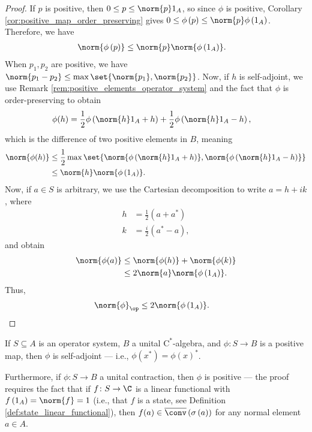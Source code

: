 \begin{proof}
  If $p$ is positive, then $0\leq p \leq \norm{p}1_A$, so since $\phi$ is positive, Corollary \ref{cor:positive_map_order_preserving} gives $0\leq \phi\left( p \right)\leq \norm{p}\phi\left( 1_A \right)$. Therefore, we have
  \begin{align*}
    \norm{\phi\left( p \right)} &\leq \norm{p}\norm{\phi\left( 1_A \right)}.
  \end{align*}
  When $p_1,p_2$ are positive, we have $\norm{p_1 - p_2}\leq \max\set{\norm{p_1},\norm{p_2}}$. Now, if $h$ is self-adjoint, we use Remark \ref{rem:positive_elements_operator_system} and the fact that $\phi$ is order-preserving to obtain
  \begin{align*}
    \phi(h) &= \frac{1}{2}\phi\left( \norm{h}1_A + h \right) + \frac{1}{2}\phi\left( \norm{h}1_A - h \right),
  \end{align*}
  which is the difference of two positive elements in $B$, meaning
  \begin{align*}
    \norm{\phi(h)} &\leq \frac{1}{2}\max\set{\norm{\phi\left( \norm{h}1_A + h \right)},\norm{\phi\left( \norm{h}1_A - h \right)}}\\
                   &\leq \norm{h}\norm{\phi\left( 1_A \right)}.
  \end{align*}
  Now, if $a\in S$ is arbitrary, we use the Cartesian decomposition to write $a = h + ik$, where
  \begin{align*}
    h &= \frac{1}{2}\left( a + a^{\ast} \right)\\
    k &= \frac{i}{2}\left( a^{\ast}-a \right),
  \end{align*}
  and obtain
  \begin{align*}
    \norm{\phi(a)} &\leq \norm{\phi(h)} + \norm{\phi(k)}\\
                   &\leq 2\norm{a}\norm{\phi\left( 1_A \right)}.
  \end{align*}
  Thus,
  \begin{align*}
    \norm{\phi}_{\op} &\leq 2\norm{\phi\left( 1_A \right)}.
  \end{align*}
\end{proof}
\begin{remark}
  If $S\subseteq A$ is an operator system, $B$ a unital $\mathrm{C}^{\ast}$-algebra, and $\phi\colon S\rightarrow B$ is a positive map, then $\phi$ is self-adjoint --- i.e., $\phi\left( x^{\ast} \right) = \phi\left( x \right)^{\ast}$.\newline

  Furthermore, if $\phi\colon S\rightarrow B$ a unital contraction, then $\phi$ is positive --- the proof requires the fact that if $f\colon S\rightarrow \C$ is a linear functional with $f\left(1_A\right) = \norm{f} = 1$ (i.e., that $f$ is a state, see Definition \ref{def:state_linear_functional}), then $f(a)\in \overline{\conv}\left( \sigma\left( a \right) \right)$ for any normal element $a\in A$.
\end{remark}
